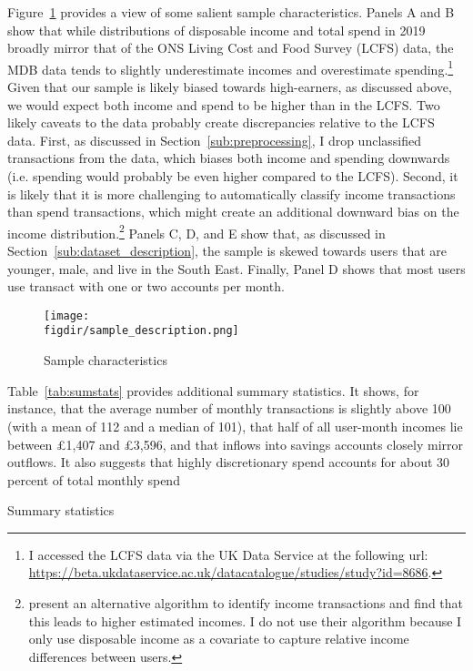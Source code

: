 Figure~\ref{fig:sample_description} provides a view of some salient sample
characteristics. Panels A and B show that while distributions of disposable
income and total spend in 2019 broadly mirror that of the ONS Living Cost and
Food Survey (LCFS) data, the MDB data tends to slightly underestimate incomes
and overestimate spending.\footnote{I accessed the LCFS data via the UK Data
Service at the following url:
\url{https://beta.ukdataservice.ac.uk/datacatalogue/studies/study?id=8686}.}
Given that our sample is likely biased towards high-earners, as discussed
above, we would expect both income and spend to be higher than in the LCFS. Two
likely caveats to the data probably create discrepancies relative to the LCFS
data. First, as discussed in Section~\ref{sub:preprocessing}, I drop
unclassified transactions from the data, which biases both income and spending
downwards (i.e. spending would probably be even higher compared to the LCFS).
Second, it is likely that it is more challenging to automatically classify
income transactions than spend transactions, which might create an additional
downward bias on the income distribution.\footnote{\citet{bourquin2020effects}
    present an alternative algorithm to identify income transactions and find
that this leads to higher estimated incomes. I do not use their algorithm
because I only use disposable income as a covariate to capture relative income
differences between users.} Panels C, D, and E show that, as discussed in
Section~\ref{sub:dataset_description}, the sample is skewed towards users that
are younger, male, and live in the South East. Finally, Panel D shows that most
users use transact with one or two accounts per month.

\begin{figure}[H]
    \centering
    \caption{Sample characteristics}
    \texttt{[image: \\figdir/sample\_description.png]}
    \label{fig:sample_description}
\end{figure}

Table~\ref{tab:sumstats} provides additional summary statistics. It shows, for
instance, that the average number of monthly transactions is slightly above 100
(with a mean of 112 and a median of 101), that half of all user-month incomes
lie between \pounds1,407 and \pounds3,596, and that inflows into savings
accounts closely mirror outflows. It also suggests that highly discretionary
spend accounts for about 30 percent of total monthly spend

\begin{table}[ht]
\centering\tiny
\caption{Summary statistics}
\label{tab:sumstats}

\end{table}

